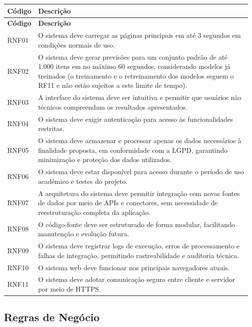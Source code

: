 \documentclass[12pt,a4paper]{article}
\providecommand{\rnf}[2]{#1 & #2 \\\midrule}
\begin{document}
\begin{longtable}{p{} p{}}
    \toprule
    \textbf{Código} & \textbf{Descrição} \\
    \midrule
    \endfirsthead
    \toprule
    \textbf{Código} & \textbf{Descrição} \\
    \midrule
    \endhead
    \rnf{RNF01}	{O sistema deve carregar as páginas principais em até 3 segundos em condições normais de uso.}
    \rnf{RNF02}	{O sistema deve gerar previsões para um conjunto padrão de até 1.000 itens em no máximo 60 segundos, considerando modelos já treinados (o treinamento e o retreinamento dos modelos seguem o RF11 e não estão sujeitos a este limite de tempo).}
    \rnf{RNF03}	{A interface do sistema deve ser intuitiva e permitir que usuários não técnicos compreendam os resultados apresentados.}
    \rnf{RNF04}	{O sistema deve exigir autenticação para acesso às funcionalidades restritas.}
    \rnf{RNF05}	{O sistema deve armazenar e processar apenas os dados necessários à finalidade proposta, em conformidade com a LGPD, garantindo minimização e proteção dos dados utilizados.}
    \rnf{RNF06}	{O sistema deve estar disponível para acesso durante o período de uso acadêmico e testes do projeto.}
    \rnf{RNF07}	{A arquitetura do sistema deve permitir integração com novas fontes de dados por meio de APIs e conectores, sem necessidade de reestruturação completa da aplicação.}
    \rnf{RNF08}	{O código-fonte deve ser estruturado de forma modular, facilitando manutenção e evolução futura.}
    \rnf{RNF09}	{O sistema deve registrar logs de execução, erros de processamento e falhas de integração, permitindo rastreabilidade e auditoria técnica.}
    \rnf{RNF10}	{O sistema web deve funcionar nos principais navegadores atuais.}
    \rnf{RNF11}	{O sistema deve adotar comunicação segura entre cliente e servidor por meio de HTTPS.}
    \bottomrule
\end{longtable}

\subsection{Regras de Negócio}
\end{document}
